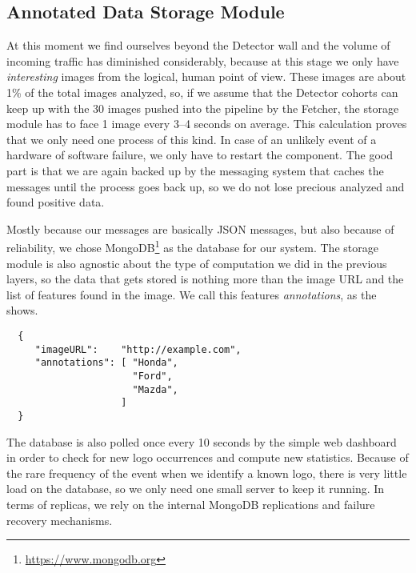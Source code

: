 
\subsection{Annotated Data Storage Module}
\label{sub-sec:ads-module}

At this moment we find ourselves beyond the Detector wall and the volume of
incoming traffic has diminished considerably, because at this stage we only
have \textit{interesting} images from the logical, human point of view. These
images are about 1\% of the total images analyzed, so, if we assume that the
Detector cohorts can keep up with the 30 images pushed into the pipeline by
the Fetcher, the storage module has to face 1 image every 3--4 seconds on
average. This calculation proves that we only need one process of this kind.
In case of an unlikely event of a hardware of software failure, we only have
to restart the component. The good part is that we are again backed up by the
messaging system that caches the messages until the process goes back up, so
we do not lose precious analyzed and found positive data.

Mostly because our messages are basically JSON messages, but also because of
reliability, we chose MongoDB\footnote{\url{https://www.mongodb.org}} as the
database for our system. The storage module is also agnostic about the type of
computation we did in the previous layers, so the data that gets stored is
nothing more than the image URL and the list of features found in the image.
We call this features \textit{annotations}, as the
 shows.

\lstset{caption=MongoDB Document,label=lst:mongo-json}
\begin{lstlisting}
  {
     "imageURL":    "http://example.com",
     "annotations": [ "Honda",
                      "Ford",
                      "Mazda",
                    ]
  }
\end{lstlisting}

The database is also polled once every 10 seconds by the simple web dashboard
in order to check for new logo occurrences and compute new statistics. Because
of the rare frequency of the event when we identify a known logo, there is very
little load on the database, so we only need one small server to keep it
running. In terms of replicas, we rely on the internal MongoDB replications
and failure recovery mechanisms.

